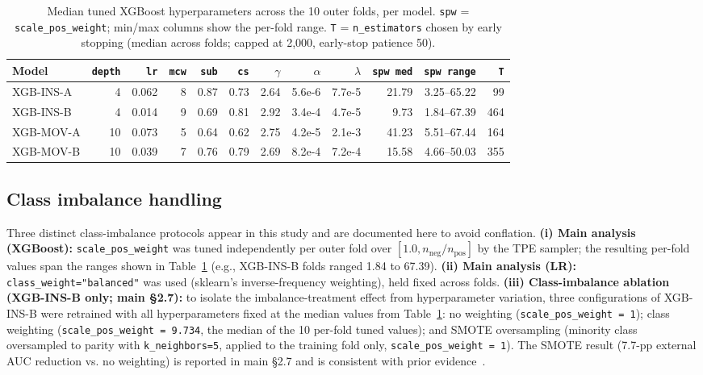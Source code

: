 \documentclass[11pt,a4paper]{article}
\providecommand{\bomark}{\bottomrule}
\begin{document}
\begin{table}[H]
\centering
\caption{Median tuned XGBoost hyperparameters across the 10 outer folds, per
model. \texttt{spw} = \texttt{scale\_pos\_weight}; min/max columns show the
per-fold range. \texttt{T} = \texttt{n\_estimators} chosen by early
stopping (median across folds; capped at 2{,}000, early-stop patience 50).}
\label{tab:s2-xgb-tuned}
\setlength{\tabcolsep}{4pt}
\begin{tabular}{lrrrrrrrrrrr}
\toprule
\textbf{Model} & \texttt{depth} & \texttt{lr} & \texttt{mcw} & \texttt{sub} & \texttt{cs} & \texttt{$\gamma$} & \texttt{$\alpha$} & \texttt{$\lambda$} & \texttt{spw med} & \texttt{spw range} & \texttt{T} \\
\midrule
XGB-INS-A & 4 & 0.062 & 8 & 0.87 & 0.73 & 2.64 & 5.6e-6 & 7.7e-5 & 21.79 & 3.25--65.22 & 99 \\
XGB-INS-B & 4 & 0.014 & 9 & 0.69 & 0.81 & 2.92 & 3.4e-4 & 4.7e-5 & 9.73 & 1.84--67.39 & 464 \\
XGB-MOV-A & 10 & 0.073 & 5 & 0.64 & 0.62 & 2.75 & 4.2e-5 & 2.1e-3 & 41.23 & 5.51--67.44 & 164 \\
XGB-MOV-B & 10 & 0.039 & 7 & 0.76 & 0.79 & 2.69 & 8.2e-4 & 7.2e-4 & 15.58 & 4.66--50.03 & 355 \\
\bomark
\end{tabular}
\end{table}

\subsection{Class imbalance handling}\label{supp:s2-imbalance}

Three distinct class-imbalance protocols appear in this study and are
documented here to avoid conflation. \textbf{(i) Main analysis (XGBoost):}
\texttt{scale\_pos\_weight} was tuned independently per outer fold over
$[1.0, n_{\text{neg}}/n_{\text{pos}}]$ by the TPE sampler; the resulting per-fold
values span the ranges shown in Table~\ref{tab:s2-xgb-tuned} (e.g., XGB-INS-B
folds ranged 1.84 to 67.39). \textbf{(ii) Main analysis (LR):} \texttt{class\_weight="balanced"}
was used (sklearn's inverse-frequency weighting), held fixed across folds.
\textbf{(iii) Class-imbalance ablation (XGB-INS-B only; main \S2.7):}
to isolate the imbalance-treatment effect from hyperparameter variation, three
configurations of XGB-INS-B were retrained with all hyperparameters fixed at
the median values from Table~\ref{tab:s2-xgb-tuned}: no weighting
(\texttt{scale\_pos\_weight = 1}); class weighting
(\texttt{scale\_pos\_weight = 9.734}, the median of the 10 per-fold tuned
values); and SMOTE oversampling (minority class oversampled to parity with
\texttt{k\_neighbors=5},
applied to the training fold only, \texttt{scale\_pos\_weight = 1}). The
SMOTE result (7.7-pp external AUC reduction vs. no weighting) is reported in
main \S2.7 and is consistent with prior evidence~\cite{Carriero2025}.
\end{document}
